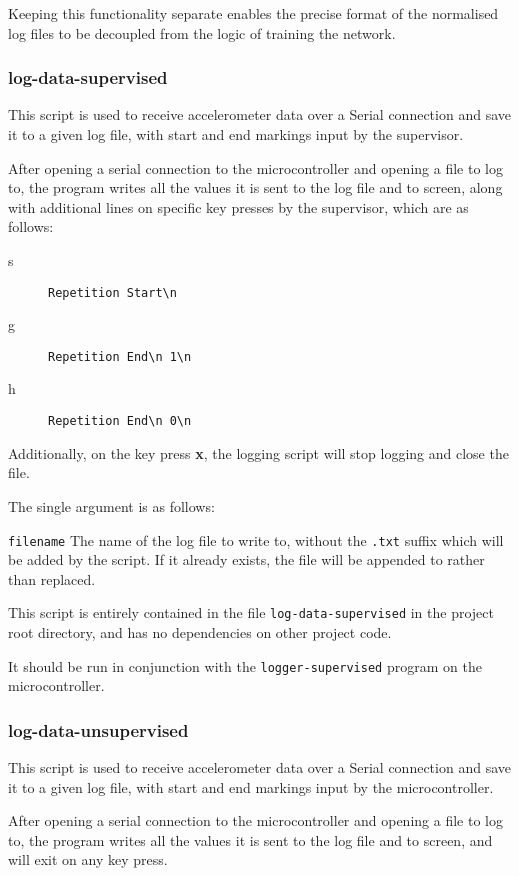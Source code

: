 \documentclass[a4paper]{article}
\begin{document}
Keeping this functionality separate enables the precise format of the normalised log files to be decoupled from the logic of training the network.

\subsubsection{log-data-supervised}

This script is used to receive accelerometer data over a Serial connection and save it to a given log file, with start and end markings input by the supervisor.

After opening a serial connection to the microcontroller and opening a file to log to, the program writes all the values it is sent to the log file and to screen, along with additional lines on specific key presses by the supervisor, which are as follows:

\begin{description}
\item[s] \lstinline|Repetition Start\n|
\item[g] \lstinline|Repetition End\n 1\n|
\item[h] \lstinline|Repetition End\n 0\n|
\end{description}

Additionally, on the key press \textbf{x}, the logging script will stop logging and close the file.

The single argument is as follows:

\lstinline{filename} The name of the log file to write to, without the \lstinline{.txt} suffix which will be added by the script. If it already exists, the file will be appended to rather than replaced.

This script is entirely contained in the file \lstinline{log-data-supervised} in the project root directory, and has no dependencies on other project code.

It should be run in conjunction with the \lstinline{logger-supervised} program on the microcontroller.

\subsubsection{log-data-unsupervised}

This script is used to receive accelerometer data over a Serial connection and save it to a given log file, with start and end markings input by the microcontroller.

After opening a serial connection to the microcontroller and opening a file to log to, the program writes all the values it is sent to the log file and to screen, and will exit on any key press.
\end{document}
